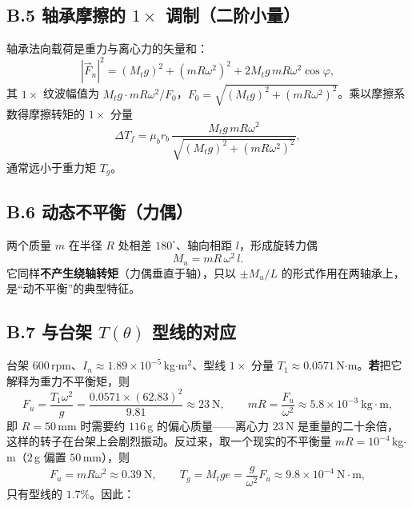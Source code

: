 \subsection*{B.5 轴承摩擦的 $1\times$ 调制（二阶小量）}

轴承法向载荷是重力与离心力的矢量和：
\begin{equation}
|\vec F_n|^2=(M_t g)^2+(mR\omega^2)^2+2M_t g\,mR\omega^2\cos\varphi,
\end{equation}
其 $1\times$ 纹波幅值为 $M_tg\cdot mR\omega^2/F_0$，$F_0=\sqrt{(M_tg)^2+(mR\omega^2)^2}$。乘以摩擦系数得摩擦转矩的 $1\times$ 分量
\begin{equation}
\Delta T_f=\mu_b r_b\,\frac{M_t g\,mR\omega^2}{\sqrt{(M_tg)^2+(mR\omega^2)^2}},
\label{eq:unb-DTf}
\end{equation}
通常远小于重力矩 $T_g$。

\subsection*{B.6 动态不平衡（力偶）}

两个质量 $m$ 在半径 $R$ 处相差 $180^\circ$、轴向相距 $l$，形成旋转力偶
\begin{equation}
M_u=mR\,\omega^2\,l .
\label{eq:unb-Mu}
\end{equation}
它同样\textbf{不产生绕轴转矩}（力偶垂直于轴），只以 $\pm M_u/L$ 的形式作用在两轴承上，是“动不平衡”的典型特征。

\subsection*{B.7 与台架 $T(\theta)$ 型线的对应}

台架 $600$\,rpm、$I_n\approx1.89\times10^{-5}$\,kg$\cdot$m$^2$、型线 $1\times$ 分量 $T_1\approx0.0571$\,N$\cdot$m。\textbf{若}把它解释为重力不平衡矩，则
\begin{equation}
F_u=\frac{T_1\omega^2}{g}
=\frac{0.0571\times(62.83)^2}{9.81}\approx23\ \mathrm{N},
\qquad
mR=\frac{F_u}{\omega^2}\approx5.8\times10^{-3}\ \mathrm{kg\cdot m},
\end{equation}
即 $R=50$\,mm 时需要约 $116$\,g 的偏心质量——离心力 $23$\,N 是重量的二十余倍，这样的转子在台架上会剧烈振动。反过来，取一个现实的不平衡量 $mR=10^{-4}$\,kg$\cdot$m（$2$\,g 偏置 $50$\,mm），则
\begin{equation}
F_u=mR\omega^2\approx0.39\ \mathrm{N},\qquad
T_g=M_t g e=\frac{g}{\omega^2}F_u\approx9.8\times10^{-4}\ \mathrm{N\cdot m},
\end{equation}
只有型线的 $1.7\%$。因此：

